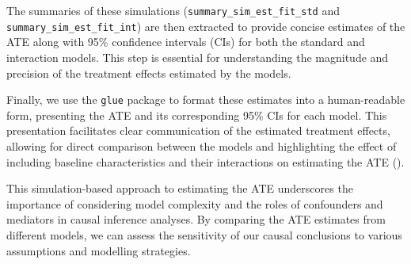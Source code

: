 \documentclass[
  singlecolumn]{article}
\begin{document}
The summaries of these simulations (\texttt{summary\_sim\_est\_fit\_std}
and \texttt{summary\_sim\_est\_fit\_int}) are then extracted to provide
concise estimates of the ATE along with 95\% confidence intervals (CIs)
for both the standard and interaction models. This step is essential for
understanding the magnitude and precision of the treatment effects
estimated by the models.

Finally, we use the \texttt{glue} package to format these estimates into
a human-readable form, presenting the ATE and its corresponding 95\% CIs
for each model. This presentation facilitates clear communication of the
estimated treatment effects, allowing for direct comparison between the
models and highlighting the effect of including baseline characteristics
and their interactions on estimating the ATE
().

This simulation-based approach to estimating the ATE underscores the
importance of considering model complexity and the roles of confounders
and mediators in causal inference analyses. By comparing the ATE
estimates from different models, we can assess the sensitivity of our
causal conclusions to various assumptions and modelling strategies.
\end{document}
